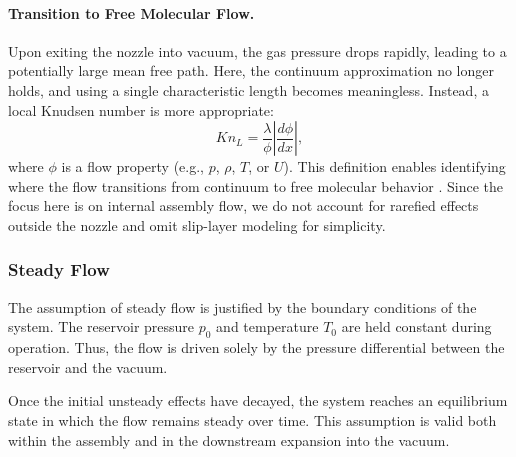	\paragraph{Transition to Free Molecular Flow.}
		Upon exiting the nozzle into vacuum, the gas pressure drops rapidly, leading to a potentially large mean free path.
		Here, the continuum approximation no longer holds, and using a single characteristic length becomes meaningless.
		Instead, a local Knudsen number is more appropriate:
		\begin{equation}
		  Kn_L
		  = \frac{\lambda}{\phi}\left|\frac{d\phi}{dx}\right|,
		\end{equation}
		where \(\phi\) is a flow property (e.g., \(p\), \(\rho\), \(T\), or \(U\)).
		This definition enables identifying where the flow transitions from continuum to free molecular behavior \cite{bird_dsmc_2013,Grabe2008,LiLam1964}.
		Since the focus here is on internal assembly flow, we do not account for rarefied effects outside the nozzle and omit slip-layer modeling for simplicity.

\subsubsection*{Steady Flow}
	The assumption of steady flow is justified by the boundary conditions of the system.
	The reservoir pressure $p_0$ and temperature $T_0$ are held constant during operation.
	Thus, the flow is driven solely by the pressure differential between the reservoir and the vacuum.

	Once the initial unsteady effects have decayed, the system reaches an equilibrium state in which the flow remains steady over time.
	This assumption is valid both within the assembly and in the downstream expansion into the vacuum.
	\cite{LiLam1964}
